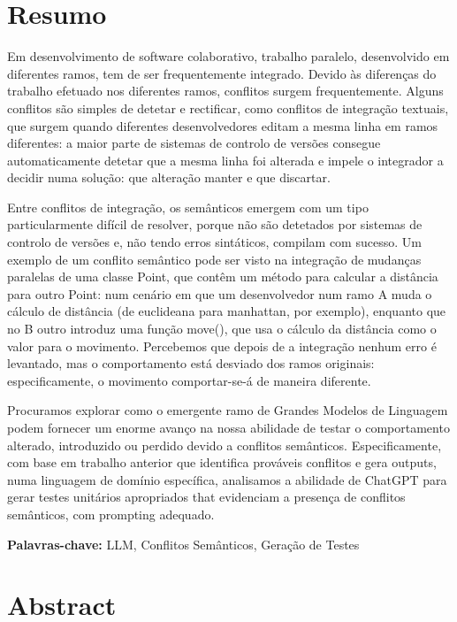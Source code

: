 \chapter*{Resumo}

Em desenvolvimento de software colaborativo, trabalho paralelo, desenvolvido em diferentes ramos, tem de ser frequentemente integrado. Devido às diferenças do trabalho efetuado nos diferentes ramos, conflitos surgem frequentemente. Alguns conflitos são simples de detetar e rectificar, como conflitos de integração textuais, que surgem quando diferentes desenvolvedores editam a mesma linha em ramos diferentes: a maior parte de sistemas de controlo de versões consegue automaticamente detetar que a mesma linha foi alterada e impele o integrador a decidir numa solução: que alteração manter e que discartar.

Entre conflitos de integração, os semânticos emergem com um tipo particularmente difícil de resolver, porque não são detetados por sistemas de controlo de versões e, não tendo erros sintáticos, compilam com sucesso. 
Um exemplo de um conflito semântico pode ser visto na integração de mudanças paralelas de uma classe Point, que contêm um método para calcular a distância para outro Point: num cenário em que um desenvolvedor num ramo A muda o cálculo de distância (de euclideana para manhattan, por exemplo), enquanto que no B outro introduz uma função move(), que usa o cálculo da distância como o valor para o movimento. Percebemos que depois de a integração nenhum erro é levantado, mas o comportamento está desviado dos ramos originais: especificamente, o movimento comportar-se-á de maneira diferente.

Procuramos explorar como o emergente ramo de Grandes Modelos de Linguagem podem fornecer um enorme avanço na nossa abilidade de testar o comportamento alterado, introduzido ou perdido devido a conflitos semânticos.
Especificamente, com base em trabalho anterior que identifica prováveis conflitos e gera outputs, numa linguagem de domínio específica, analisamos a abilidade de ChatGPT para gerar testes unitários apropriados that evidenciam a presença de conflitos semânticos, com prompting adequado.

\bigskip\noindent
\textbf{Palavras-chave:} LLM, Conflitos Semânticos, Geração de Testes


\chapter*{Abstract}

